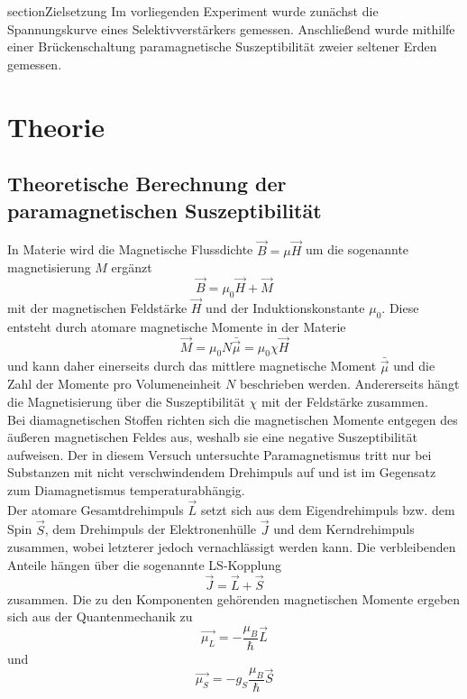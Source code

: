 section{Zielsetzung}
Im vorliegenden Experiment wurde zunächst die Spannungskurve eines Selektivverstärkers gemessen. Anschließend wurde mithilfe einer Brückenschaltung paramagnetische Suszeptibilität zweier seltener Erden gemessen.
\section{Theorie}
\subsection{Theoretische Berechnung der paramagnetischen Suszeptibilität}
In Materie wird die Magnetische Flussdichte $\vec{B}=\mu \vec{H}$ um die sogenannte magnetisierung $M$ ergänzt
\begin{equation*}
\vec{B}=\mu _0 \vec{H}+\vec{M}
\end{equation*}
mit der magnetischen Feldstärke $\vec{H}$ und der Induktionskonstante $\mu_0$. Diese entsteht durch atomare magnetische Momente in der Materie
\begin{equation}
\vec{M}=\mu_0N\bar{\vec{\mu}}=\mu_0\chi\vec{H}
\end{equation}
und kann daher einerseits durch das mittlere magnetische Moment $\bar{\vec{\mu}}$ und die Zahl der Momente pro Volumeneinheit $N$ beschrieben werden. Andererseits hängt die Magnetisierung über die Suszeptibilität $\chi$ mit der Feldstärke zusammen.\\ Bei diamagnetischen Stoffen richten sich die magnetischen Momente entgegen des äußeren magnetischen Feldes aus, weshalb sie eine negative Suszeptibilität aufweisen. Der in diesem Versuch untersuchte Paramagnetismus tritt nur bei Substanzen mit nicht verschwindendem Drehimpuls auf und ist im Gegensatz zum Diamagnetismus temperaturabhängig. \\
Der atomare Gesamtdrehimpuls $\vec{L}$ setzt sich aus dem Eigendrehimpuls bzw. dem Spin $\vec{S}$, dem Drehimpuls der Elektronenhülle $\vec{J}$ und dem Kerndrehimpuls zusammen, wobei letzterer jedoch vernachlässigt werden kann. Die verbleibenden Anteile hängen über die sogenannte LS-Kopplung
\begin{equation}
\vec{J}=\vec{L}+\vec{S}
\end{equation}
zusammen. Die zu den Komponenten gehörenden magnetischen Momente ergeben sich aus der Quantenmechanik zu
\begin{equation*}
\vec{\mu_L}=-\frac{\mu_B}{\hbar}\vec{L} 
\end{equation*}
und
\begin{equation*}
\vec{\mu_S}=-g_S\frac{\mu_B}{\hbar}\vec{S}
\end{equation*}

